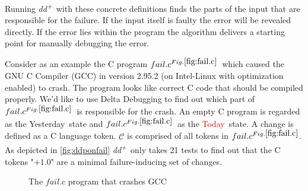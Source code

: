 \documentclass[a4paper,UKenglish]{lipics-v2018}
\newcommand{\ddp}{\textit{dd\textsuperscript{+}}}
\newcommand{\green}[1]{\textcolor{td-green}{#1}}
\newcommand{\red}[1]{\textcolor{red}{#1}}
\newcommand{\yd}[0]{\green{Yesterday}}
\newcommand{\td}[0]{\red{Today}}
\newcommand{\C}[0]{\ensuremath{\mathcal{C}}}
\newcommand{\reffail}[0]{\href{fig:fail.c}{\ensuremath{fail.c^{Fig. \ref{fig:fail.c}}}}}
\begin{document}
Running \ddp\ with these concrete definitions finds the parts of the input that are responsible for the failure. If the input itself is faulty the error will be revealed directly. If the error lies within the program the algorithm delivers a starting point for manually debugging the error.

Consider as an example the C program \reffail\ which caused the GNU C Compiler (GCC) in version 2.95.2 (on Intel-Linux with optimization enabled) to crash. The program looks like correct C code that should be compiled properly. We'd like to use Delta Debugging to find out which part of \reffail\ is responsible for the crash. An empty C program is regarded as the \yd\ state and \reffail\ as the \td\ state. A change is defined as a C language token. $\C$ is comprised of all tokens in \reffail. As depicted in \ref{fig:ddponfail} \ddp\ only takes 21 tests to find out that the C tokens "$+ 1.0$" are a minimal failure-inducing set of changes.
\\
\begin{figure}[h!]
	\caption{The $fail.c$ program that crashes GCC}
	\label{fig:fail.c}
\end{figure}
\\
\end{document}
